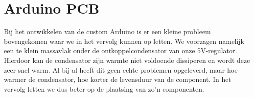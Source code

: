 \section{Arduino PCB}
Bij het ontwikkelen van de custom Arduino is er een kleine probleem bovengekomen waar we in het vervolg kunnen op letten. We voorzagen namelijk een te klein massavlak onder de ontkoppelcondensator van onze 5V-regulator. Hierdoor kan de condensator zijn warmte niet voldoende dissiperen en wordt deze zeer snel warm. Al bij al heeft dit geen echte problemen opgeleverd, maar hoe warmer de condensator, hoe korter de levensduur van de component. In het vervolg letten we dus beter op de plaatsing van zo'n componenten.